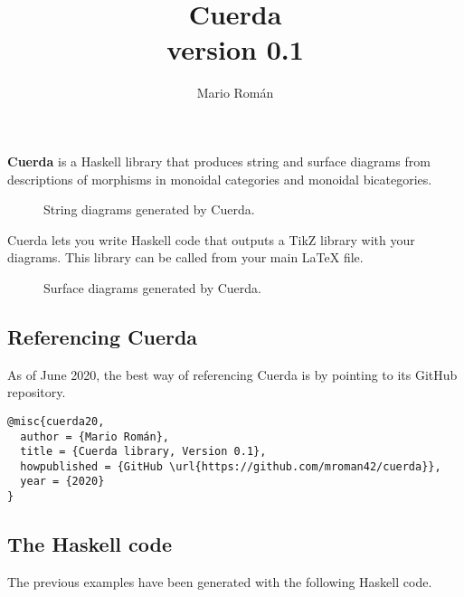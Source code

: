 \documentclass{article}
\title{Cuerda \\ \normalsize{\textsf{version 0.1}}}
\author{Mario Román}
\begin{document}
\maketitle

\textbf{Cuerda} is a Haskell library that produces string and surface diagrams from descriptions of morphisms in monoidal categories and monoidal bicategories.

\begin{figure}[h]
  \centering
  \assocOne \qquad
  \assocTwo
  \caption{String diagrams generated by Cuerda.}
\end{figure}

Cuerda lets you write Haskell code that outputs a TikZ library with your diagrams. This library can be called from your main LaTeX file.

\begin{figure}[h]
  \centering
  \associatorDiagram \quad
  \leftUnitorDiagram \quad
  \rightUnitorDiagram
  \caption{Surface diagrams generated by Cuerda.}
\end{figure}



\subsection*{Referencing Cuerda}

As of June 2020, the best way of referencing \textsf{Cuerda} is by pointing to its GitHub repository.

\begin{verbatim}
@misc{cuerda20,
  author = {Mario Román},
  title = {Cuerda library, Version 0.1},
  howpublished = {GitHub \url{https://github.com/mroman42/cuerda}},
  year = {2020}
}

\end{verbatim}


\subsection*{The Haskell code}

The previous examples have been generated with the following Haskell code.
\end{document}
